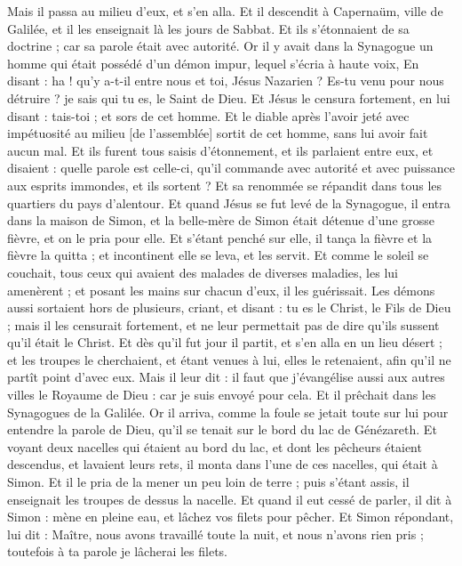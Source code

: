 \begin{multicols}{2}
Mais il passa au milieu d'eux, et s'en alla.
Et il descendit à Capernaüm, ville de Galilée, et il les enseignait là les jours de Sabbat.
Et ils s'étonnaient de sa doctrine ; car sa parole était avec autorité.
Or il y avait dans la Synagogue un homme qui était possédé d'un démon impur, lequel s'écria à haute voix,
En disant : ha ! qu'y a-t-il entre nous et toi, Jésus Nazarien ? Es-tu venu pour nous détruire ? je sais qui tu es, le Saint de Dieu.
Et Jésus le censura fortement, en lui disant : tais-toi ; et sors de cet homme. Et le diable après l'avoir jeté avec impétuosité au milieu [de l'assemblée] sortit de cet homme, sans lui avoir fait aucun mal.
Et ils furent tous saisis d'étonnement, et ils parlaient entre eux, et disaient : quelle parole est celle-ci, qu'il commande avec autorité et avec puissance aux esprits immondes, et ils sortent ?
Et sa renommée se répandit dans tous les quartiers du pays d'alentour.
Et quand Jésus se fut levé de la Synagogue, il entra dans la maison de Simon, et la belle-mère de Simon était détenue d'une grosse fièvre, et on le pria pour elle.
Et s'étant penché sur elle, il tança la fièvre et la fièvre la quitta ; et incontinent elle se leva, et les servit.
Et comme le soleil se couchait, tous ceux qui avaient des malades de diverses maladies, les lui amenèrent ; et posant les mains sur chacun d'eux, il les guérissait.
Les démons aussi sortaient hors de plusieurs, criant, et disant : tu es le Christ, le Fils de Dieu ; mais il les censurait fortement, et ne leur permettait pas de dire qu'ils sussent qu'il était le Christ.
Et dès qu'il fut jour il partit, et s'en alla en un lieu désert ; et les troupes le cherchaient, et étant venues à lui, elles le retenaient, afin qu'il ne partît point d'avec eux.
Mais il leur dit : il faut que j'évangélise aussi aux autres villes le Royaume de Dieu : car je suis envoyé pour cela.
Et il prêchait dans les Synagogues de la Galilée.
\VerseOne{}Or il arriva, comme la foule se jetait toute sur lui pour entendre la parole de Dieu, qu'il se tenait sur le bord du lac de Génézareth.
Et voyant deux nacelles qui étaient au bord du lac, et dont les pêcheurs étaient descendus, et lavaient leurs rets, il monta dans l'une de ces nacelles, qui était à Simon.
Et il le pria de la mener un peu loin de terre ; puis s'étant assis, il enseignait les troupes de dessus la nacelle.
Et quand il eut cessé de parler, il dit à Simon : mène en pleine eau, et lâchez vos filets pour pêcher.
Et Simon répondant, lui dit : Maître, nous avons travaillé toute la nuit, et nous n'avons rien pris ; toutefois à ta parole je lâcherai les filets.

\end{multicols}
